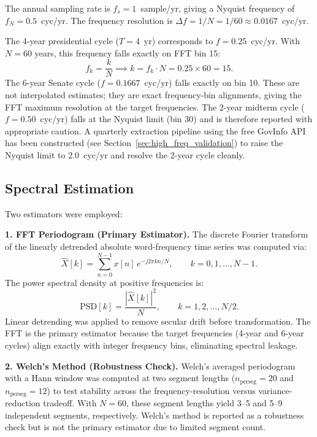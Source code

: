 The annual sampling rate is $f_s = 1$~sample/yr, giving a Nyquist frequency of $f_N = 0.5$~cyc/yr. The frequency resolution is $\Delta f = 1/N = 1/60 \approx 0.0167$~cyc/yr.

\begin{keyinsight}
The 4-year presidential cycle ($T = 4$~yr) corresponds to $f = 0.25$~cyc/yr. With $N = 60$ years, this frequency falls exactly on FFT bin 15:
\[
f_k = \frac{k}{N} \implies k = f_k \cdot N = 0.25 \times 60 = 15.
\]
The 6-year Senate cycle ($f = 0.1667$~cyc/yr) falls exactly on bin 10. These are not interpolated estimates; they are exact frequency-bin alignments, giving the FFT maximum resolution at the target frequencies. The 2-year midterm cycle ($f = 0.50$~cyc/yr) falls at the Nyquist limit (bin 30) and is therefore reported with appropriate caution. A quarterly extraction pipeline using the free GovInfo API has been constructed (see Section~\ref{sec:high_freq_validation}) to raise the Nyquist limit to $2.0$~cyc/yr and resolve the 2-year cycle cleanly.
\end{keyinsight}

\subsection{Spectral Estimation}

Two estimators were employed:

\textbf{1. FFT Periodogram (Primary Estimator).} The discrete Fourier transform of the linearly detrended absolute word-frequency time series was computed via:
\begin{equation}\label{eq:21.4-fft-definition}
\hat{X}[k] = \sum_{n=0}^{N-1} x[n] \, e^{-j 2\pi k n / N}, \qquad k = 0, 1, \ldots, N-1.
\end{equation}
The power spectral density at positive frequencies is:
\begin{equation}\label{eq:21.5-psd-definition}
\text{PSD}[k] = \frac{|\hat{X}[k]|^2}{N}, \qquad k = 1, 2, \ldots, N/2.
\end{equation}
Linear detrending was applied to remove secular drift before transformation. The FFT is the primary estimator because the target frequencies (4-year and 6-year cycles) align exactly with integer frequency bins, eliminating spectral leakage.

\textbf{2. Welch's Method (Robustness Check).} Welch's averaged periodogram with a Hann window was computed at two segment lengths ($n_{\text{perseg}} = 20$ and $n_{\text{perseg}} = 12$) to test stability across the frequency-resolution versus variance-reduction tradeoff. With $N = 60$, these segment lengths yield 3--5 and 5--9 independent segments, respectively. Welch's method is reported as a robustness check but is not the primary estimator due to limited segment count.

